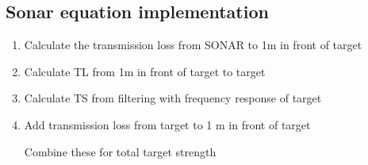 \documentclass[11pt]{article}
\begin{document}


\subsection*{Sonar equation implementation}
\begin{enumerate}
    \item Calculate the transmission loss from SONAR to 1m in front of target
    \item Calculate TL from 1m in front of target to target 
    \item Calculate TS from filtering with frequency response of target
    \item Add transmission loss from target to 1 m in front of target
    
    Combine these for total target strength
\end{enumerate}









\end{document}
